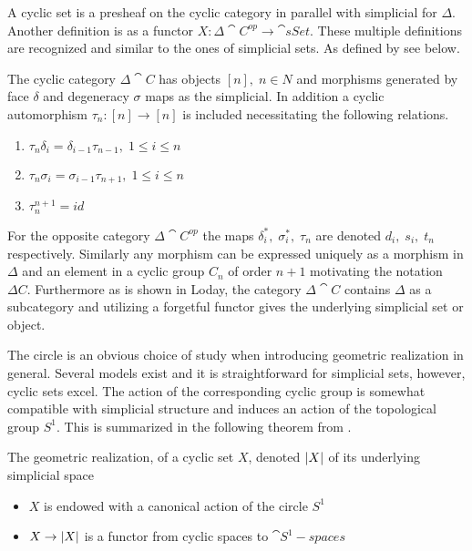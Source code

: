 \documentclass[../../main.tex]{subfiles}
\begin{document}
    A cyclic set is a presheaf on the cyclic category in parallel with  simplicial for $\Delta$. Another definition is as a functor $X:\Delta \cat{C^{op}} \to \cat{sSet}$. These multiple definitions are recognized and similar to the ones of simplicial sets. As defined by \cite{loday-cyclic} see below.
    
    \begin{definition}
        The cyclic category $\Delta \cat{C}$ has objects $[n], \;n\in N$ and morphisms generated by face $\delta$ and degeneracy $\sigma$ maps as the simplicial. In addition a cyclic automorphism $\tau_n:[n]\to [n]$ is included necessitating the following relations.
        \begin{enumerate}
            \item $\tau _n\delta_i=\delta_{i-1}\tau_{n-1},\; 1 \leq i\leq n$
            \item $\tau _n \sigma_i=\sigma_{i-1}\tau_{n+1},\; 1 \leq i\leq n$
            \item $\tau_{n}^{n+1}=id$
        \end{enumerate}
    \end{definition}

    For the opposite category $\Delta \cat{C^{op}}$ the maps $\delta_i^*, \; \sigma_i^*,\;\tau_n$ are denoted $d_i,\; s_i, \; t_n$ respectively. Similarly any morphism can be expressed uniquely as a morphism in $\Delta$ and an element in a cyclic group $C_n$ of order $n+1$ motivating the notation $\Delta C$. Furthermore as is shown in Loday, the category $\Delta \cat{C}$ contains $\Delta$ as a subcategory and utilizing a forgetful functor gives the underlying simplicial set or object. 

    The circle is an obvious choice of study when introducing geometric realization in general. Several models exist and it is straightforward for simplicial sets, however, cyclic sets excel. The action of the corresponding cyclic group is somewhat compatible with simplicial structure and induces an action of the topological group $S^1$. This is summarized in the following theorem from \cite{loday-cyclic}.

    \begin{theorem}\label{hardstuff}
        The geometric realization, of a cyclic set $X$, denoted $\geom[X]$ of its underlying simplicial space
        \begin{itemize}
            \item $X$ is endowed with a canonical action of the circle $S^1$
            \item $X \to \geom[X]$ is a functor from cyclic spaces to $\cat{S^1-spaces}$
        \end{itemize}
    \end{theorem} %
\end{document}
